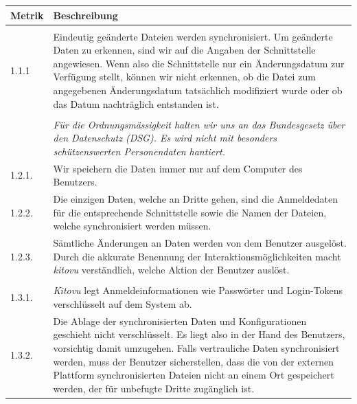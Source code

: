 \documentclass[a4paper]{article}
\begin{document}
\begin{tabulary}{\linewidth}{lL}
  \toprule
  Metrik & Beschreibung \\
  \midrule

   \\
  1.1.1 & Eindeutig geänderte Dateien werden synchronisiert. Um geänderte Daten zu erkennen, sind wir auf die Angaben der Schnittstelle angewiesen. Wenn also die Schnittstelle nur ein Änderungsdatum zur Verfügung stellt, können wir nicht erkennen, ob die Datei zum angegebenen Änderungsdatum tatsächlich modifiziert wurde oder ob das Datum nachträglich entstanden ist. \\

   \\
  & \emph{Für die Ordnungsmässigkeit halten wir uns an das Bundesgesetz über den Datenschutz (DSG\footnotemark). Es wird nicht mit besonders schützenswerten Personendaten hantiert.} \\
  1.2.1. & Wir speichern die Daten immer nur auf dem Computer des Benutzers. \\
  1.2.2. & Die einzigen Daten, welche an Dritte gehen, sind die Anmeldedaten für die entsprechende Schnittstelle sowie die Namen der Dateien, welche synchronisiert werden müssen. \\
  1.2.3. & Sämtliche Änderungen an Daten werden von dem Benutzer ausgelöst. Durch die akkurate Benennung der Interaktionsmöglichkeiten macht \emph{kitovu} verständlich, welche Aktion der Benutzer auslöst. \\

   \\
  1.3.1. & \emph{Kitovu} legt Anmeldeinformationen wie Passwörter und Login-Tokens verschlüsselt auf dem System ab. \\
  1.3.2. & Die Ablage der synchronisierten Daten und Konfigurationen geschieht nicht verschlüsselt. Es liegt also in der Hand des Benutzers, vorsichtig damit umzugehen. \newline Falls vertrauliche Daten synchronisiert werden, muss der Benutzer sicherstellen, dass die von der externen Plattform synchronisierten Dateien nicht an einem Ort gespeichert werden, der für unbefugte Dritte zugänglich ist. \\
  \bottomrule
\end{tabulary}

\end{document}
